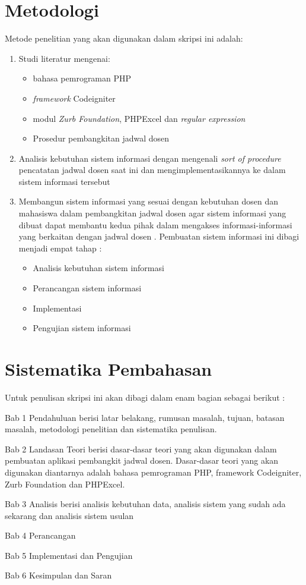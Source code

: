 \section{Metodologi}
\label{sec:metlit}
Metode penelitian yang akan digunakan dalam skripsi ini adalah:
\begin{enumerate}
   \item Studi literatur mengenai:
   		\begin{itemize}
 		\item bahasa pemrograman PHP
 		\item \textit{framework} Codeigniter
 		\item modul \textit{Zurb Foundation}, PHPExcel dan \textit{regular expression}
 		\item Prosedur pembangkitan jadwal dosen
		\end{itemize}
   \item Analisis kebutuhan sistem informasi dengan mengenali \textit{sort of procedure} pencatatan jadwal dosen saat ini dan mengimplementasikannya ke dalam sistem informasi tersebut
    \item Membangun sistem informasi yang sesuai dengan kebutuhan dosen dan mahasiswa dalam pembangkitan jadwal dosen agar sistem informasi yang dibuat dapat membantu kedua pihak dalam mengakses informasi-informasi yang berkaitan dengan jadwal dosen . Pembuatan sistem informasi ini dibagi menjadi empat tahap :
    	\begin{itemize}
 		\item Analisis kebutuhan sistem informasi 
 		\item Perancangan sistem informasi
 		\item Implementasi 
 		\item Pengujian sistem informasi
		\end{itemize}
\end{enumerate}
 

\section{Sistematika Pembahasan}
\label{sec:sispem}
Untuk penulisan skripsi ini akan dibagi dalam enam bagian sebagai berikut :

Bab 1 Pendahuluan berisi latar belakang, rumusan masalah, tujuan, batasan masalah,  metodologi penelitian dan sistematika penulisan.

Bab 2 Landasan Teori berisi dasar-dasar teori yang akan digunakan dalam pembuatan aplikasi pembangkit jadwal dosen. Dasar-dasar teori yang akan digunakan diantarnya adalah bahasa pemrograman PHP, framework Codeigniter, Zurb Foundation dan PHPExcel.

Bab 3 Analisis berisi analisis kebutuhan data, analisis sistem yang sudah ada sekarang dan analisis sistem usulan

Bab 4 Perancangan

Bab 5 Implementasi dan Pengujian

Bab 6 Kesimpulan dan Saran
